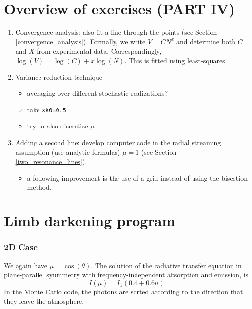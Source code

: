 \documentclass[../main/main.tex]{subfiles}
\begin{document}
\newpage
\section{Overview of exercises (PART IV)}
\begin{enumerate}
\item Convergence analysis: also fit a line through the points (see Section \underline{\ref{convergence_analysis}}). Formally, we write $V = CN^x$ and determine both $C$ and $X$ from experimental data. Correspondingly, $\log(V) = \log(C) + x\log(N)$. This is fitted using least-squares.

\item Variance reduction technique
\begin{itemize}
\item averaging over different stochastic realizations?
\item take \texttt{xk0=0.5}
\item try to also discretize $\mu$
\end{itemize}

\item Adding a second line: develop computer code in the radial streaming assumption (use analytic formulas) $\mu = 1$ (see Section \underline{\ref{two_resonance_lines}}).
\begin{itemize}
\item a following improvement is the use of a grid instead of using the bisection method.
\end{itemize}

\end{enumerate}


\newpage
\section{Limb darkening program}

\label{limb_darkening_discussion}

\subsubsection{2D Case}
We again have $\mu = \cos(\theta)$. The solution of the radiative transfer equation in \underline{plane-parallel syummetry} with frequency-independent absorption and emission, is 
\begin{equation}
I(\mu) = I_1 (0.4 + 0.6\mu)
\end{equation}
In the Monte Carlo code, the photons are sorted according to the direction that they leave the atmosphere.
\end{document}
